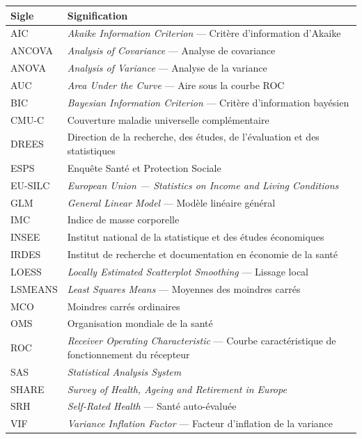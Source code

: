 \documentclass[11pt,a4paper]{memoirerecherche}
\begin{document}
\begin{tabular}{@{} l @{\hspace{1.5em}} p{12cm} @{}}
\toprule
\textbf{Sigle} & \textbf{Signification} \\
\midrule
AIC & \textit{Akaike Information Criterion} --- Critère d'information d'Akaike \\
ANCOVA & \textit{Analysis of Covariance} --- Analyse de covariance \\
ANOVA & \textit{Analysis of Variance} --- Analyse de la variance \\
AUC & \textit{Area Under the Curve} --- Aire sous la courbe ROC \\
BIC & \textit{Bayesian Information Criterion} --- Critère d'information bayésien \\
CMU-C & Couverture maladie universelle complémentaire \\
DREES & Direction de la recherche, des études, de l'évaluation et des statistiques \\
ESPS & Enquête Santé et Protection Sociale \\
EU-SILC & \textit{European Union --- Statistics on Income and Living Conditions} \\
GLM & \textit{General Linear Model} --- Modèle linéaire général \\
IMC & Indice de masse corporelle \\
INSEE & Institut national de la statistique et des études économiques \\
IRDES & Institut de recherche et documentation en économie de la santé \\
LOESS & \textit{Locally Estimated Scatterplot Smoothing} --- Lissage local \\
LSMEANS & \textit{Least Squares Means} --- Moyennes des moindres carrés \\
MCO & Moindres carrés ordinaires \\
OMS & Organisation mondiale de la santé \\
ROC & \textit{Receiver Operating Characteristic} --- Courbe caractéristique de fonctionnement du récepteur \\
SAS & \textit{Statistical Analysis System} \\
SHARE & \textit{Survey of Health, Ageing and Retirement in Europe} \\
SRH & \textit{Self-Rated Health} --- Santé auto-évaluée \\
VIF & \textit{Variance Inflation Factor} --- Facteur d'inflation de la variance \\
\bottomrule
\end{tabular}
\end{document}
